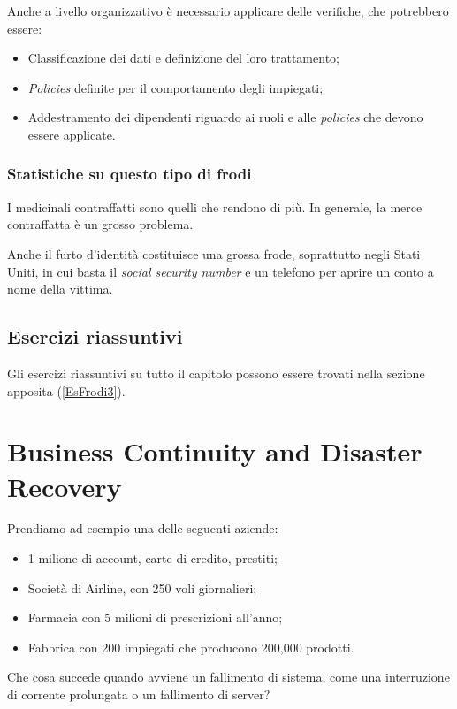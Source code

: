 Anche a livello organizzativo è necessario applicare delle verifiche, che
potrebbero essere:
\begin{itemize}
  \item Classificazione dei dati e definizione del loro trattamento;
  \item \textit{Policies} definite per il comportamento degli impiegati;
  \item Addestramento dei dipendenti riguardo ai ruoli e alle \textit{policies}
che devono essere applicate.
\end{itemize}

\subsection{Statistiche su questo tipo di frodi}

I medicinali contraffatti sono quelli che rendono di più. In generale, la merce
contraffatta è un grosso problema.

Anche il furto d'identità costituisce una grossa frode, soprattutto negli
Stati Uniti, in cui basta il \emph{social security number} e un telefono per aprire un conto
a nome della vittima.

\section{Esercizi riassuntivi}

Gli esercizi riassuntivi su tutto il capitolo possono essere trovati nella
sezione apposita (\ref{EsFrodi3}).

\chapter{Business Continuity and Disaster Recovery}
\label{BCDR}

Prendiamo ad esempio una delle seguenti aziende:
\begin{itemize}
  \item 1 milione di account, carte di credito, prestiti;
  \item Società di Airline, con 250 voli giornalieri;
  \item Farmacia con 5 milioni di prescrizioni all'anno;
  \item Fabbrica con 200 impiegati che producono 200,000 prodotti.
\end{itemize}

Che cosa succede quando avviene un fallimento di sistema, come una interruzione
di corrente prolungata o un fallimento di server?


